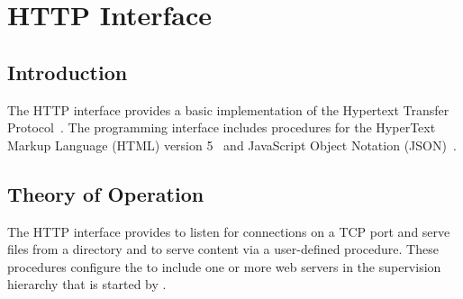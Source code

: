 %
%
%


\chapter {HTTP Interface}\label{chap:http}

\section {Introduction}

The HTTP interface provides a basic implementation of the Hypertext
Transfer Protocol~\cite{RFC7230}. The programming interface includes
procedures for the HyperText Markup Language (HTML) version
5~\cite{html5} and JavaScript Object Notation (JSON)~\cite{RFC7159}.

\section {Theory of Operation}

The HTTP interface provides  to listen for
connections on a TCP port and serve files from a directory and
 to serve content via a user-defined
procedure. These procedures configure the  to
include one or more web servers in the supervision hierarchy that is
started by .

